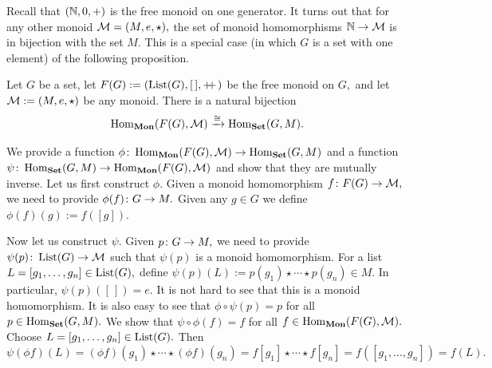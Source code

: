 \documentclass[CT4S-EN-RU]{subfiles}
\begin{document}
\begin{exerciseRUS}
\end{exerciseRUS}



\subsubsection{}

\begin{blockENG}
Recall that $({\mathbb N},0,+)$ is the free monoid on one generator. It turns out that for any other monoid $\mathcal{M}=(M,e,\star),$ the set of monoid homomorphisms ${\mathbb N}\rightarrow\mathcal{M}$ is in bijection with the set $M.$ This is a special case (in which $G$ is a set with one element) of the following proposition.
\end{blockENG}

\begin{blockRUS}
\end{blockRUS}

\begin{propositionENG}\label{prop:free monoid}
Let $G$ be a set, let $F(G):=(\operatorname{List}(G),[\,],+\!\!+\hspace{1pt})$ be the free monoid on $G,$ and let $\mathcal{M}:=(M,e,\star)$ be any monoid. There is a natural bijection
$$\operatorname{Hom}_{\mathbf{Mon}}(F(G),\mathcal{M})\xrightarrow{\cong}\operatorname{Hom}_{\mathbf{Set}}(G,M).$$
\end{propositionENG}

\begin{propositionRUS}\label{prop:free monoid}
\end{propositionRUS}

\begin{proofENG}
We provide a function $\phi\colon\operatorname{Hom}_{\mathbf{Mon}}(F(G),\mathcal{M})\rightarrow\operatorname{Hom}_{\mathbf{Set}}(G,M)$ and a function $\psi\colon\operatorname{Hom}_{\mathbf{Set}}(G,M)\rightarrow\operatorname{Hom}_{\mathbf{Mon}}(F(G),\mathcal{M})$ and show that they are mutually inverse. Let us first construct $\phi.$ Given a monoid homomorphism $f\colon F(G)\rightarrow\mathcal{M},$ we need to provide $\phi(f)\colon G\rightarrow M.$ Given any $g\in G$ we define $\phi(f)(g):=f([g]).$

Now let us construct $\psi.$ Given $p\colon G\rightarrow M,$ we need to provide $\psi(p)\colon\operatorname{List}(G)\rightarrow\mathcal{M}$ such that $\psi(p)$ is a monoid homomorphism. For a list $L=[g_1,\ldots,g_n]\in\operatorname{List}(G),$ define $\psi(p)(L):=p(g_1)\star\cdots\star p(g_n)\in M.$ In particular, $\psi(p)([\,])=e.$ It is not hard to see that this is a monoid homomorphism. It is also easy to see that $\phi\circ\psi(p)=p$ for all $p\in\operatorname{Hom}_{\mathbf{Set}}(G,M).$ We show that $\psi\circ\phi(f)=f$ for all $f\in\operatorname{Hom}_{\mathbf{Mon}}(F(G),\mathcal{M}).$ Choose $L=[g_1,\ldots,g_n]\in\operatorname{List}(G).$ Then
$$\psi(\phi f)(L)=(\phi f)(g_1)\star\cdots\star(\phi f)(g_n)=f[g_1]\star\cdots\star f[g_n]=f([g_1,\ldots,g_n])=f(L).$$
\end{proofENG}
\end{document}
